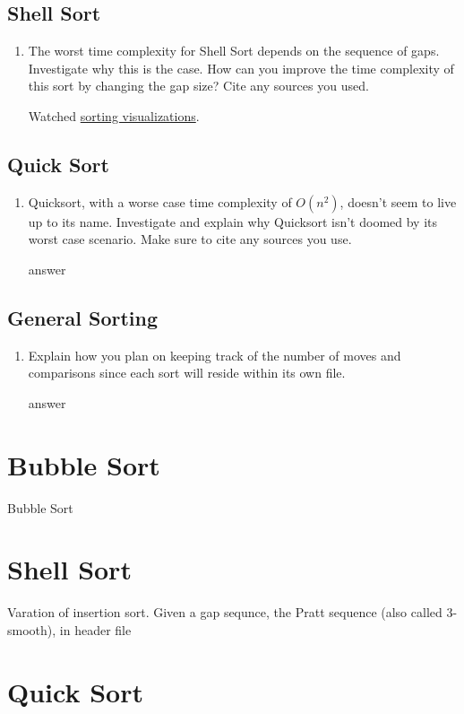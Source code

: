 \documentclass[12pt]{article}
\newenvironment{QandA}{\begin{enumerate}[label=\bfseries\alph*.]\bfseries}
                      {\end{enumerate}}
\newenvironment{answered}{\par\normalfont}{}
\begin{document}
\subsection{Shell Sort}
\begin{QandA}

	\item The worst time complexity for Shell Sort depends on the sequence of gaps. Investigate why this is the case. How can you improve the time complexity of this sort by changing the gap size? Cite any sources you used.
		\begin{answered}
			Watched \href{https://www.youtube.com/watch?v=NYWEM7H3iYc\&t=269s}{sorting visualizations}.
		\end{answered}

\end{QandA}

\subsection{Quick Sort}
\begin{QandA}
	\item Quicksort, with a worse case time complexity of $O(n^2)$, doesn’t seem to live up to its name. Investigate and explain why Quicksort isn’t doomed by its worst case scenario. Make sure to cite any sources you use.
		\begin{answered}
			answer
		\end{answered}


\end{QandA}

\subsection{General Sorting}
\begin{QandA}
	\item Explain how you plan on keeping track of the number of moves and comparisons since each sort will reside within its own file.
		\begin{answered}
			answer
		\end{answered}


\end{QandA}
\section{Bubble Sort}

Bubble Sort

\section{Shell Sort}

Varation of insertion sort.
Given a gap sequnce, the Pratt sequence (also called 3-smooth), in header file
\section{Quick Sort}
\end{document}
